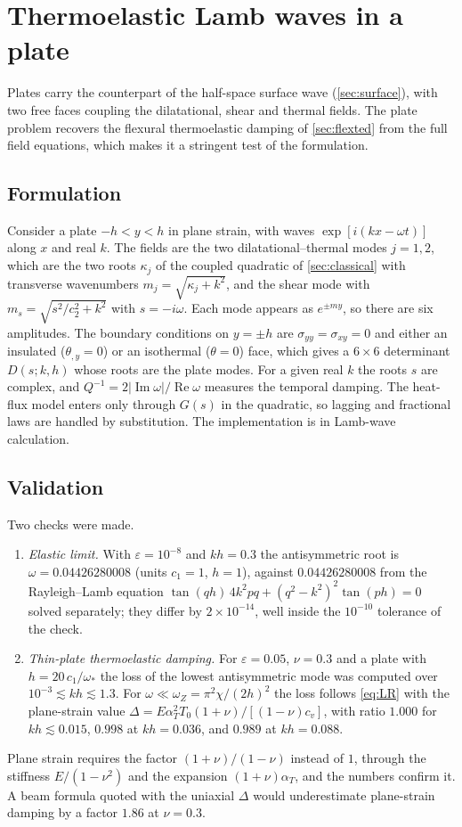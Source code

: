 \section{Thermoelastic Lamb waves in a plate}\label{sec:lamb}

Plates carry the counterpart of the half-space surface wave (\cref{sec:surface}), with two free faces coupling the dilatational, shear and thermal fields. The plate problem recovers the flexural thermoelastic damping of \cref{sec:flexted} from the full field equations, which makes it a stringent test of the formulation.

\subsection{Formulation}
Consider a plate $-h<y<h$ in plane strain, with waves $\exp[i(kx-\omega t)]$ along $x$ and real $k$. The fields are the two dilatational--thermal modes $j=1,2$, which are the two roots $\kappa_j$ of the coupled quadratic of \cref{sec:classical} with transverse wavenumbers $m_j=\sqrt{\kappa_j+k^2}$, and the shear mode with $m_s=\sqrt{s^2/c_2^2+k^2}$ with $s=-i\omega$. Each mode appears as $e^{\pm m y}$, so there are six amplitudes. The boundary conditions on $y=\pm h$ are $\sigma_{yy}=\sigma_{xy}=0$ and either an insulated ($\theta_{,y}=0$) or an isothermal ($\theta=0$) face, which gives a $6\times6$ determinant $D(s;k,h)$ whose roots are the plate modes. For a given real $k$ the roots $s$ are complex, and $Q^{-1}=2|\operatorname{Im}\omega|/\operatorname{Re}\omega$ measures the temporal damping. The heat-flux model enters only through $G(s)$ in the quadratic, so lagging and fractional laws are handled by substitution. The implementation is in Lamb-wave calculation.

\subsection{Validation}
Two checks were made.
\begin{enumerate}
\item \emph{Elastic limit.} With $\varepsilon=10^{-8}$ and $kh=0.3$ the antisymmetric root is $\omega=0.04426280008$ (units $c_1=1$, $h=1$), against $0.04426280008$ from the Rayleigh--Lamb equation $\tan(qh)\,4k^2pq+(q^2-k^2)^2\tan(ph)=0$ solved separately; they differ by $2\times10^{-14}$, well inside the $10^{-10}$ tolerance of the check.
\item \emph{Thin-plate thermoelastic damping.} For $\varepsilon=0.05$, $\nu=0.3$ and a plate with $h=20\,c_1/\omega_*$ the loss of the lowest antisymmetric mode was computed over $10^{-3}\lesssim kh\lesssim1.3$. For $\omega\ll\omega_Z=\pi^2\chi/(2h)^2$ the loss follows \cref{eq:LR} with the plane-strain value $\Delta=E\alpha_T^2T_0(1+\nu)/[(1-\nu)c_v]$, with ratio $1.000$ for $kh\lesssim0.015$, $0.998$ at $kh=0.036$, and $0.989$ at $kh=0.088$.
\end{enumerate}
Plane strain requires the factor $(1+\nu)/(1-\nu)$ instead of $1$, through the stiffness $E/(1-\nu^2)$ and the expansion $(1+\nu)\alpha_T$, and the numbers confirm it. A beam formula quoted with the uniaxial $\Delta$ would underestimate plane-strain damping by a factor $1.86$ at $\nu=0.3$.


